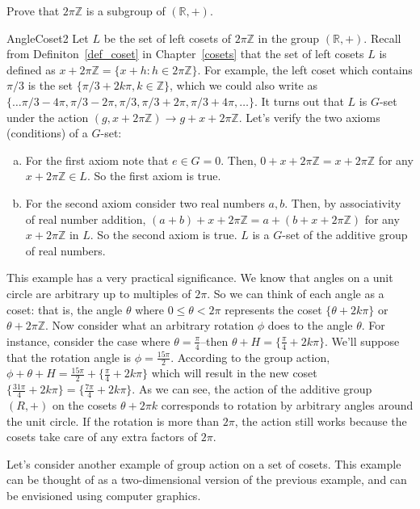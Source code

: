 \begin{exercise}\label{exercise:actions:AngleCoset1}
Prove that $2 \pi \mathbb{Z}$ is a subgroup of $(\mathbb{R},+)$.
\end{exercise}
\begin {example}{AngleCoset2}
Let $L$ be the set of left cosets of $2\pi \mathbb{Z}$ in the group $(\mathbb{R},+)$.  Recall from Definiton~\ref{def_coset} in Chapter~\ref{cosets} that the set of left cosets $L$ is defined as $x+2\pi \mathbb{Z}=\{x+h:h\in 2\pi\mathbb{Z}\}$.  For example, the left coset which contains $\pi/3$ is the set $ \{\pi/3 +2k\pi, k\in \mathbb{Z}\}$, which we could also write as $\{ \ldots \pi/3-4\pi, \pi/3-2\pi, \pi/3, \pi/3+2\pi, \pi/3 + 4\pi, \ldots \}$.  It turns out that $L$ is $G$-set under the action  
$(g,x+2\pi\mathbb{Z}) \rightarrow g+x+2\pi\mathbb{Z}$. Let's verify the two axioms (conditions) of a $G$-set:
\begin{enumerate}[(a)]
\item
 For the first axiom note that $e\in G=0$. Then, $0+x+2\pi\mathbb{Z}=x+2\pi\mathbb{Z}$ for any $x+2\pi\mathbb{Z}\in L$.  So the first axiom is true.
\item 
For the second axiom consider two real numbers $a,b$.  Then, by associativity of real number addition, $(a+b)+x+2\pi\mathbb{Z}=a+(b+x+2\pi\mathbb{Z})$ for any $x+2\pi\mathbb{Z}$  in $L$.  So the second axiom is true.  $L$ is a $G$-set of the additive group of real numbers.
\end {enumerate}
This example has a very practical significance. We know that angles on a unit circle are arbitrary up to multiples of $2\pi$. So we can think of each angle as a coset:  that is, the angle $\theta$ where $0\leq\theta<2\pi$ represents the coset $\{\theta +2k\pi\}$ or $\theta + 2\pi \mathbb{Z}$. Now consider what an arbitrary rotation $\phi$ does to the angle $\theta$. For instance, consider the case where $\theta=\frac{\pi}{4}$--then $\theta+H=\{ \frac{\pi}{4}+2k\pi\}$.  We'll suppose that the rotation angle is $\phi=\frac{15\pi}{2}$.  According to the group action, $\phi+\theta+H =\frac{15\pi}{2}+\{\frac{\pi}{4}+2k\pi\}$ which will result in the new coset $\{\frac{31\pi}{4}+2k\pi\}=\{\frac{7\pi}{4}+2k\pi\}$.
As we can see, the action of the additive group $(R,+)$ on the cosets ${\theta + 2\pi k}$ corresponds to rotation by arbitrary angles around the unit circle. If the rotation is more than $2 \pi$, the action still works because the cosets take care of any extra factors of $2 \pi$.
\end {example}
Let's consider another example of group action on a set of cosets.  This example can be thought of as a two-dimensional version of the previous example, and can be envisioned using computer graphics.

